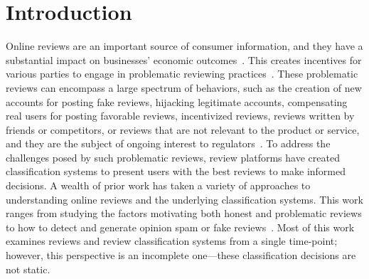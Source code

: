 \section{Introduction} \label{sec:introduction}




Online reviews are an important source of consumer information, and they have a substantial impact on businesses' economic outcomes~\cite{luca2016reviews,anderson2012impact}. This creates incentives for various parties to engage in problematic reviewing practices~\cite{streitfeld2012buy,miller19plastic}. These problematic reviews can encompass a large spectrum of behaviors, such as the creation of new accounts for posting fake reviews, hijacking legitimate accounts, compensating real users for posting favorable reviews, incentivized reviews, reviews written by friends or competitors, or reviews that are not relevant to the product or service, and they are the subject of ongoing interest to regulators~\cite{jindal2008opinion,yelpwhyrec,ftc21notice}. To address the challenges posed by such problematic reviews, review platforms have created classification systems to present users with the best reviews to make informed decisions. A wealth of prior work has taken a variety of approaches to understanding online reviews and the underlying classification systems. This work ranges from studying the factors motivating both honest and problematic reviews to how to detect and generate opinion spam or fake reviews~\cite{jindal2008opinion,yoo2008motivates,baginski2014exploring}. Most of this work examines reviews and review classification systems from a single time-point; however, this perspective is an incomplete one---these classification decisions are not static.


